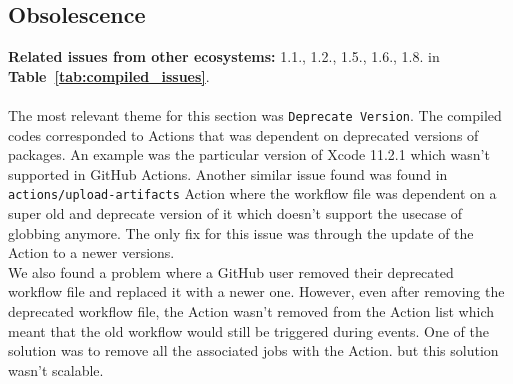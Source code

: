 \documentclass[conference]{IEEEtran}
\begin{document}
\subsection*{\textbf{Obsolescence}}
\textbf{Related issues from other ecosystems:} 1.1., 1.2., 1.5., 1.6., 1.8. in \textbf{Table~\ref{tab:compiled_issues}}.\\\\
The most relevant theme for this section was \texttt{Deprecate Version}. The compiled codes corresponded  to Actions that was dependent on deprecated versions of packages. An example was the particular version of Xcode 11.2.1 which wasn't supported in GitHub Actions. Another similar issue found was found in \texttt{actions/upload-artifacts} Action where the workflow file was dependent on a super old and deprecate version of it which doesn't support the usecase of globbing anymore. The only fix for this issue was through the update of the Action to a newer versions. \\
We also found a problem where a GitHub user removed their deprecated workflow file and replaced it with a newer one. However, even after removing the deprecated workflow file, the Action wasn't removed from the Action list which meant that the old workflow would still be triggered during events. One of the solution was to remove all the associated jobs with the Action. but this solution wasn't scalable.
\end{document}
